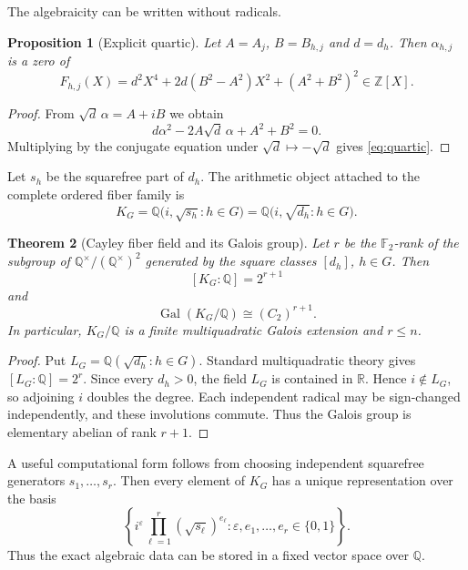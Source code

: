 \documentclass[11pt,a4paper]{article}
\newtheorem{theorem}{Theorem}[section]
\newtheorem{proposition}[theorem]{Proposition}
\theoremstyle{definition}
\newcommand{\Q}{\mathbb{Q}}
\newcommand{\Z}{\mathbb{Z}}
\newcommand{\R}{\mathbb{R}}
\newcommand{\Ftwo}{\mathbb{F}_2}
\newcommand{\Gal}{\operatorname{Gal}}
\begin{document}
The algebraicity can be written without radicals.

\begin{proposition}[Explicit quartic]
\label{prop:quartic}
Let $A=A_j$, $B=B_{h,j}$ and $d=d_h$.  Then $\alpha_{h,j}$ is a zero of
\begin{equation}
\label{eq:quartic}
F_{h,j}(X)
=d^2X^4+2d(B^2-A^2)X^2+(A^2+B^2)^2\in\Z[X].
\end{equation}
\end{proposition}

\begin{proof}
From $\sqrt d\,\alpha=A+iB$ we obtain
\[
d\alpha^2-2A\sqrt d\,\alpha+A^2+B^2=0.
\]
Multiplying by the conjugate equation under $\sqrt d\mapsto-\sqrt d$ gives \eqref{eq:quartic}.
\end{proof}

Let $s_h$ be the squarefree part of $d_h$.  The arithmetic object attached to the complete ordered fiber family is
\begin{equation}
\label{eq:KG}
\boxed{
K_G=\Q\bigl(i,\sqrt{s_h}:h\in G\bigr)
=\Q\bigl(i,\sqrt{d_h}:h\in G\bigr).
}
\end{equation}

\begin{theorem}[Cayley fiber field and its Galois group]
\label{thm:galois}
Let $r$ be the $\Ftwo$-rank of the subgroup of $\Q^\times/(\Q^\times)^2$ generated by the square classes $[d_h]$, $h\in G$.  Then
\[
[K_G:\Q]=2^{r+1}
\]
and
\begin{equation}
\label{eq:galois}
\boxed{
\Gal(K_G/\Q)\cong (C_2)^{r+1}.
}
\end{equation}
In particular, $K_G/\Q$ is a finite multiquadratic Galois extension and $r\le n$.
\end{theorem}

\begin{proof}
Put $L_G=\Q(\sqrt{d_h}:h\in G)$.  Standard multiquadratic theory gives $[L_G:\Q]=2^r$.  Since every $d_h>0$, the field $L_G$ is contained in $\R$.  Hence $i\notin L_G$, so adjoining $i$ doubles the degree.  Each independent radical may be sign-changed independently, and these involutions commute.  Thus the Galois group is elementary abelian of rank $r+1$.
\end{proof}

A useful computational form follows from choosing independent squarefree generators $s_1,\ldots,s_r$.  Then every element of $K_G$ has a unique representation over the basis
\begin{equation}
\label{eq:basis}
\left\{i^\varepsilon\prod_{\ell=1}^r(\sqrt{s_\ell})^{e_\ell}:
\varepsilon,e_1,\ldots,e_r\in\{0,1\}\right\}.
\end{equation}
Thus the exact algebraic data can be stored in a fixed vector space over $\Q$.
\end{document}

